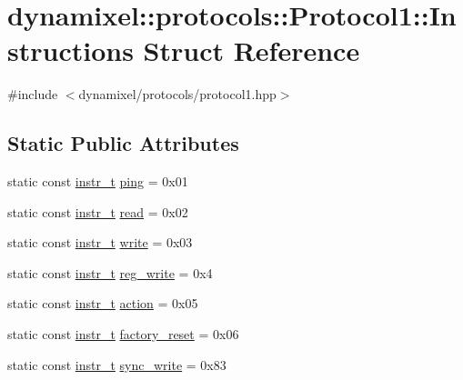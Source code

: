 \hypertarget{structdynamixel_1_1protocols_1_1_protocol1_1_1_instructions}{}\section{dynamixel\+:\+:protocols\+:\+:Protocol1\+:\+:Instructions Struct Reference}
\label{structdynamixel_1_1protocols_1_1_protocol1_1_1_instructions}


{\ttfamily \#include $<$dynamixel/protocols/protocol1.\+hpp$>$}

\subsection*{Static Public Attributes}
\begin{DoxyCompactItemize}
\item 
static const \hyperlink{classdynamixel_1_1protocols_1_1_protocol1_a572dc8c0871ecdf3d62c4f58fbcfd454}{instr\+\_\+t} \hyperlink{structdynamixel_1_1protocols_1_1_protocol1_1_1_instructions_a5f3c4f45c13704cd4e16857b9703381f}{ping} = 0x01
\item 
static const \hyperlink{classdynamixel_1_1protocols_1_1_protocol1_a572dc8c0871ecdf3d62c4f58fbcfd454}{instr\+\_\+t} \hyperlink{structdynamixel_1_1protocols_1_1_protocol1_1_1_instructions_aef0342001d9a7c736febe04cf5add82d}{read} = 0x02
\item 
static const \hyperlink{classdynamixel_1_1protocols_1_1_protocol1_a572dc8c0871ecdf3d62c4f58fbcfd454}{instr\+\_\+t} \hyperlink{structdynamixel_1_1protocols_1_1_protocol1_1_1_instructions_ac41fa9bb55c7a922e39d12b120cd9e51}{write} = 0x03
\item 
static const \hyperlink{classdynamixel_1_1protocols_1_1_protocol1_a572dc8c0871ecdf3d62c4f58fbcfd454}{instr\+\_\+t} \hyperlink{structdynamixel_1_1protocols_1_1_protocol1_1_1_instructions_a5618595565df6a1a550b6b7f8d3566e7}{reg\+\_\+write} = 0x4
\item 
static const \hyperlink{classdynamixel_1_1protocols_1_1_protocol1_a572dc8c0871ecdf3d62c4f58fbcfd454}{instr\+\_\+t} \hyperlink{structdynamixel_1_1protocols_1_1_protocol1_1_1_instructions_a4d59693b1b5c280190abb42a8dec9fb3}{action} = 0x05
\item 
static const \hyperlink{classdynamixel_1_1protocols_1_1_protocol1_a572dc8c0871ecdf3d62c4f58fbcfd454}{instr\+\_\+t} \hyperlink{structdynamixel_1_1protocols_1_1_protocol1_1_1_instructions_a8e98cd7b24b3c22979188178628c2285}{factory\+\_\+reset} = 0x06
\item 
static const \hyperlink{classdynamixel_1_1protocols_1_1_protocol1_a572dc8c0871ecdf3d62c4f58fbcfd454}{instr\+\_\+t} \hyperlink{structdynamixel_1_1protocols_1_1_protocol1_1_1_instructions_a557c148ebb26337a93396e26e4998c4e}{sync\+\_\+write} = 0x83
\end{DoxyCompactItemize}


